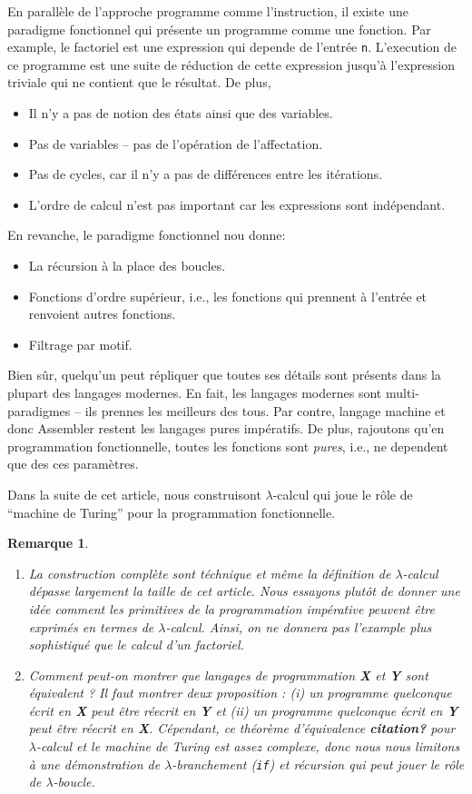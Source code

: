 \documentclass[12pt, a4paper]{article}
\newtheorem*{remark}{Remarque}
\begin{document}
En parallèle de l'approche programme comme l'instruction, il existe une paradigme fonctionnel qui présente un programme comme une fonction.
Par example, le factoriel est une expression qui depende de l'entrée \verb|n|.
L'execution de ce programme est une suite de réduction de cette expression jusqu'à l'expression triviale qui ne contient que le résultat.
De plus,
\begin{itemize}
	\item Il n'y a pas de notion des états ainsi que des variables.
	\item Pas de variables -- pas de l'opération de l'affectation.
	\item Pas de cycles, car il n'y a pas de différences entre les itérations.
	\item L'ordre de calcul n'est pas important car les expressions sont indépendant.
\end{itemize}
En revanche, le paradigme fonctionnel nou donne:
\begin{itemize}
	\item La récursion à la place des boucles.
	\item Fonctions d'ordre supérieur, i.e., les fonctions qui prennent à l'entrée et renvoient autres fonctions.
	\item Filtrage par motif.
\end{itemize}
Bien sûr, quelqu'un peut répliquer que toutes ses détails sont présents dans la plupart des langages modernes.
En fait, les langages modernes sont multi-paradigmes -- ils prennes les meilleurs des tous.
Par contre, langage machine et donc Assembler restent les langages pures impératifs.
De plus, rajoutons qu'en programmation fonctionnelle, toutes les fonctions sont \emph{pures}, i.e., ne dependent que des ces paramètres.

Dans la suite de cet article, nous construisont $\lambda$-calcul qui joue le rôle de ``machine de Turing'' pour la programmation fonctionnelle.
\begin{remark}
	$\quad$
	\begin{enumerate}
		\item La construction complète sont téchnique et même la définition de $\lambda$-calcul dépasse largement la taille de cet article. Nous essayons plutôt de donner une idée comment les primitives de la programmation impérative peuvent être exprimés en termes de $\lambda$-calcul. Ainsi, on ne donnera pas l'example plus sophistiqué que le calcul d'un factoriel.
		\item Comment peut-on montrer que langages de programmation \textbf{X} et \textbf{Y} sont équivalent ? Il faut montrer deux proposition : (i) un programme quelconque écrit en \textbf{X} peut être réecrit en \textbf{Y} et (ii) un programme quelconque écrit en \textbf{Y} peut être réecrit en \textbf{X}. Cépendant, ce théorème d'équivalence \textbf{citation?} pour $\lambda$-calcul et le machine de Turing est assez complexe, donc nous nous limitons à une démonstration de \emph{$\lambda$-branchement} (\verb|if|) et récursion qui peut jouer le rôle de \emph{$\lambda$-boucle}.
	\end{enumerate}
\end{remark}
\end{document}
